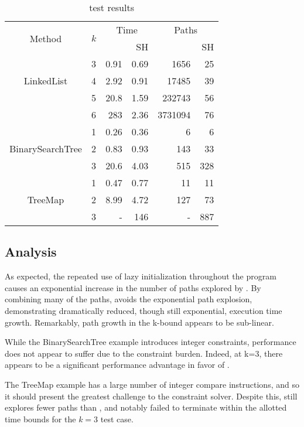 \begin{table} [h]
  \centering
  \begin{tabular}{| c | c | r | r | r | r | }
  \hline
   \multirow{2}{*}{Method }&\multirow{2}{*}{ $k$ }
   &\multicolumn{2}{|c|}{Time} &\multicolumn{2}{|c|}{ Paths }\\
								&	&\gsetxt{}	&SH	&\gsetxt{} & SH\\
   \hline
    \multirow{3}{*}{LinkedList }&3	& 0.91 & 0.69  &1656 & 25		 \\
   		 				& 4	& 2.92 & 0.91	&17485  & 39 \\
   						& 5	& 20.8 & 1.59 &232743 & 56\\
						& 6	& 283 & 2.36		&3731094 & 76\\
    \hline
    \multirow{3}{*}{BinarySearchTree } & 1	&0.26	& 0.36 & 6	 & 6\\
   		 				& 2	& 0.83 & 0.93	& 143 & 33\\
   						& 3	& 20.6 & 4.03 & 515 & 328\\
    \hline
      \multirow{3}{*}{TreeMap}&1	 & 0.47 & 0.77 &11 & 11 \\
   		 				&2	& 8.99 & 4.72	& 127 & 73 \\
   						& 3	& - & 146	& - & 887 \\
						
    \hline
  \end{tabular}
  \caption{test results}
  \label{tab:results}
\end{table}

\subsection{Analysis}

As expected, the repeated use of lazy initialization throughout the program causes an exponential increase in the number of paths explored by \gsetxt{}. By combining many of the \gsetxt{} paths, \symtxt{} avoids the exponential path explosion, demonstrating dramatically reduced, though still exponential, execution time growth. Remarkably, path growth in the k-bound appears to be sub-linear.

While the BinarySearchTree example introduces integer constraints, \symtxt{} performance does not appear to suffer due to the constraint burden. Indeed, at k=3, there appears to be a significant performance advantage in favor of \symtxt{}.

The TreeMap example has a large number of integer compare instructions, and so it should present the greatest challenge to the constraint solver. Despite this, \symtxt{} still explores fewer paths than \gsetxt{}, and \gsetxt{} notably failed to terminate within the allotted time bounds for the $k=3$ test case.



